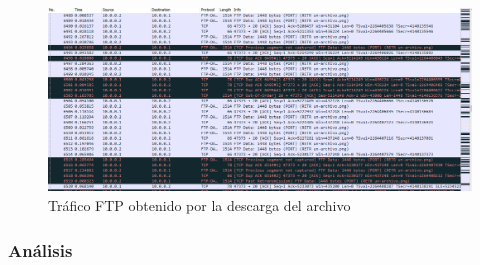 \documentclass[10pt]{article}
\begin{document}
\begin{figure}[H]
    \centering
    \includegraphics[width=\linewidth]{Imagenes/ftp_traffic.png}
    \caption{Tráfico FTP obtenido por la descarga del archivo}
    \label{fig:item04_download_wireshark}
\end{figure}


\subsubsection*{Análisis}
\end{document}
